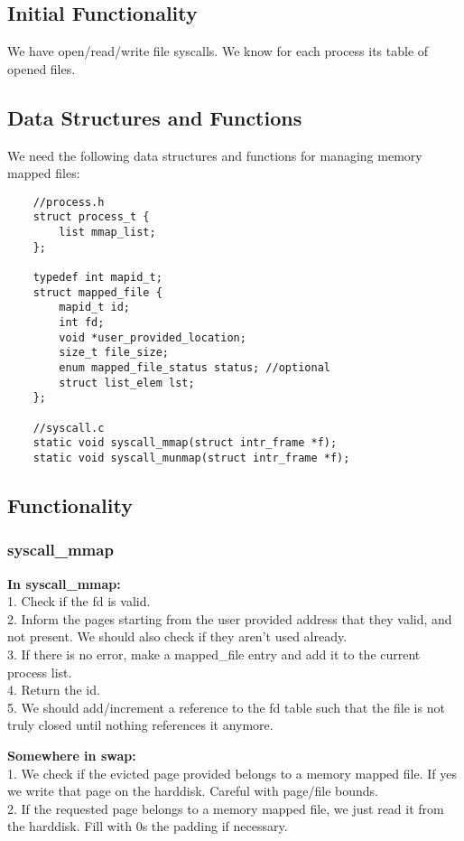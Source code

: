 \subsection{Initial Functionality}

We have open/read/write file syscalls. We know for each process its table of opened files.


\subsection{Data Structures and Functions}

We need the following data structures and functions for managing memory mapped files: 

\begin{lstlisting}
	//process.h
	struct process_t {
		list mmap_list;
	};

	typedef int mapid_t;
	struct mapped_file {
		mapid_t id;
		int fd;
		void *user_provided_location;
		size_t file_size;
		enum mapped_file_status status; //optional
		struct list_elem lst;
	};

	//syscall.c
	static void syscall_mmap(struct intr_frame *f);
	static void syscall_munmap(struct intr_frame *f);
\end{lstlisting}
	


\subsection{Functionality}

\subsubsection{ syscall\_mmap }
\textbf{In syscall\_mmap:}
	\\1. Check if the fd is valid.
	\\2. Inform the pages starting from the user provided address that they valid, and not present. We should also check if they aren't used already.
	\\3. If there is no error, make a mapped\_file entry and add it to the current process list.
	\\4. Return the id.
	\\5. We should add/increment a reference to the fd table such that the file is not truly closed until nothing references it anymore.



	\textbf{Somewhere in swap:}
	\\1. We check if the evicted page provided belongs to a memory mapped file. If yes we write that page on the harddisk. Careful with page/file bounds.
	\\2. If the requested page belongs to a memory mapped file, we just read it from the harddisk. Fill with 0s the padding if necessary.

